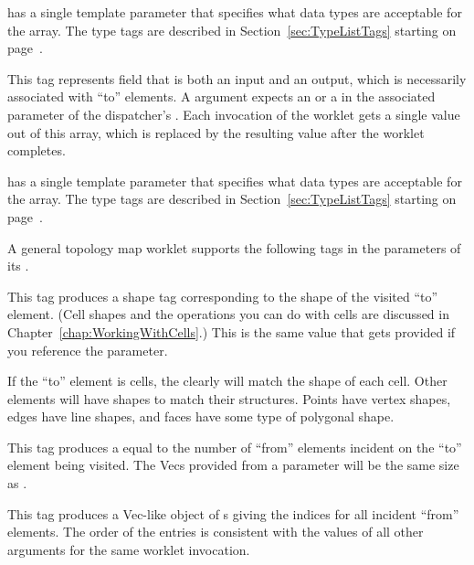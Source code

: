 \begin{description}
   has a single template parameter that specifies what
  data types are acceptable for the array. The type tags are described in
  Section~\ref{sec:TypeListTags} starting on page~\pageref{TypeTagList}.

\item[\sigtag{FieldInOut}] This tag represents field that is both an input
  and an output, which is necessarily associated with ``to'' elements. A
   argument expects an  or a
   in the associated parameter of the
  dispatcher's . Each invocation of the worklet gets a
  single value out of this array, which is replaced by the resulting value
  after the worklet completes.

   has a single template parameter that specifies what
  data types are acceptable for the array. The type tags are described in
  Section~\ref{sec:TypeListTags} starting on page~\pageref{TypeTagList}.

  \commoncontrolsignaturetags
\end{description}

A general topology map worklet supports the following tags in the
parameters of its \executionsignature.

\begin{description}
  \numericexecutionsignaturetags

\item[\sigtag{CellShape}] This tag produces a shape tag corresponding to
  the shape of the visited ``to'' element. (Cell shapes and the operations
  you can do with cells are discussed in
  Chapter~\ref{chap:WorkingWithCells}.) This is the
  same value that gets provided if you reference the
   parameter.

  If the ``to'' element is cells, the  clearly will match
  the shape of each cell. Other elements will have shapes to match their
  structures. Points have vertex shapes, edges have line shapes, and faces
  have some type of polygonal shape.

\item[\sigtag{FromCount}] This tag produces a  equal to
  the number of ``from'' elements incident on the ``to'' element being
  visited. The Vecs provided from a  parameter
  will be the same size as .

\item[\sigtag{FromIndices}] This tag produces a Vec-like object of
  s giving the indices for all incident ``from'' elements. The
  order of the entries is consistent with the values of all other
   arguments for the same worklet invocation.

  \commonexecutionsignaturetags
\end{description}

